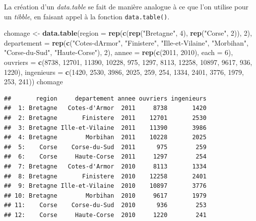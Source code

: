 \documentclass[
  11pt,
]{book}
\newenvironment{Shaded}{\begin{snugshade}}{\end{snugshade}}
\newcommand{\DataTypeTok}[1]{\textcolor[rgb]{0.13,0.29,0.53}{#1}}
\newcommand{\DecValTok}[1]{\textcolor[rgb]{0.00,0.00,0.81}{#1}}
\newcommand{\KeywordTok}[1]{\textcolor[rgb]{0.13,0.29,0.53}{\textbf{#1}}}
\newcommand{\NormalTok}[1]{#1}
\newcommand{\StringTok}[1]{\textcolor[rgb]{0.31,0.60,0.02}{#1}}
\numberwithin{equation}{section}
\numberwithin{countremarque}{section}
\begin{document}
La création d'un \emph{data.table} se fait de manière analogue à ce que l'on utilise pour un \emph{tibble}, en faisant appel à la fonction \texttt{data.table()}.

\begin{Shaded}
\begin{Highlighting}[]
\NormalTok{chomage \textless{}{-}}\StringTok{ }
\StringTok{  }\KeywordTok{data.table}\NormalTok{(}\DataTypeTok{region =} \KeywordTok{rep}\NormalTok{(}\KeywordTok{c}\NormalTok{(}\KeywordTok{rep}\NormalTok{(}\StringTok{"Bretagne"}\NormalTok{, }\DecValTok{4}\NormalTok{), }\KeywordTok{rep}\NormalTok{(}\StringTok{"Corse"}\NormalTok{, }\DecValTok{2}\NormalTok{)), }\DecValTok{2}\NormalTok{),}
             \DataTypeTok{departement =} \KeywordTok{rep}\NormalTok{(}\KeywordTok{c}\NormalTok{(}\StringTok{"Cotes{-}d\textquotesingle{}Armor"}\NormalTok{, }\StringTok{"Finistere"}\NormalTok{,}
                                 \StringTok{"Ille{-}et{-}Vilaine"}\NormalTok{, }\StringTok{"Morbihan"}\NormalTok{,}
                                 \StringTok{"Corse{-}du{-}Sud"}\NormalTok{, }\StringTok{"Haute{-}Corse"}\NormalTok{), }\DecValTok{2}\NormalTok{), }
             \DataTypeTok{annee =} \KeywordTok{rep}\NormalTok{(}\KeywordTok{c}\NormalTok{(}\DecValTok{2011}\NormalTok{, }\DecValTok{2010}\NormalTok{), }\DataTypeTok{each =} \DecValTok{6}\NormalTok{),}
             \DataTypeTok{ouvriers =} \KeywordTok{c}\NormalTok{(}\DecValTok{8738}\NormalTok{, }\DecValTok{12701}\NormalTok{, }\DecValTok{11390}\NormalTok{, }\DecValTok{10228}\NormalTok{, }\DecValTok{975}\NormalTok{, }\DecValTok{1297}\NormalTok{,}
                          \DecValTok{8113}\NormalTok{, }\DecValTok{12258}\NormalTok{, }\DecValTok{10897}\NormalTok{, }\DecValTok{9617}\NormalTok{, }\DecValTok{936}\NormalTok{, }\DecValTok{1220}\NormalTok{), }
             \DataTypeTok{ingenieurs =} \KeywordTok{c}\NormalTok{(}\DecValTok{1420}\NormalTok{, }\DecValTok{2530}\NormalTok{, }\DecValTok{3986}\NormalTok{, }\DecValTok{2025}\NormalTok{, }\DecValTok{259}\NormalTok{, }\DecValTok{254}\NormalTok{,}
                            \DecValTok{1334}\NormalTok{, }\DecValTok{2401}\NormalTok{, }\DecValTok{3776}\NormalTok{, }\DecValTok{1979}\NormalTok{, }\DecValTok{253}\NormalTok{, }\DecValTok{241}\NormalTok{))}
\NormalTok{chomage}
\end{Highlighting}
\end{Shaded}

\begin{lstlisting}
##       region     departement annee ouvriers ingenieurs
##  1: Bretagne   Cotes-d'Armor  2011     8738       1420
##  2: Bretagne       Finistere  2011    12701       2530
##  3: Bretagne Ille-et-Vilaine  2011    11390       3986
##  4: Bretagne        Morbihan  2011    10228       2025
##  5:    Corse    Corse-du-Sud  2011      975        259
##  6:    Corse     Haute-Corse  2011     1297        254
##  7: Bretagne   Cotes-d'Armor  2010     8113       1334
##  8: Bretagne       Finistere  2010    12258       2401
##  9: Bretagne Ille-et-Vilaine  2010    10897       3776
## 10: Bretagne        Morbihan  2010     9617       1979
## 11:    Corse    Corse-du-Sud  2010      936        253
## 12:    Corse     Haute-Corse  2010     1220        241
\end{lstlisting}
\end{document}
